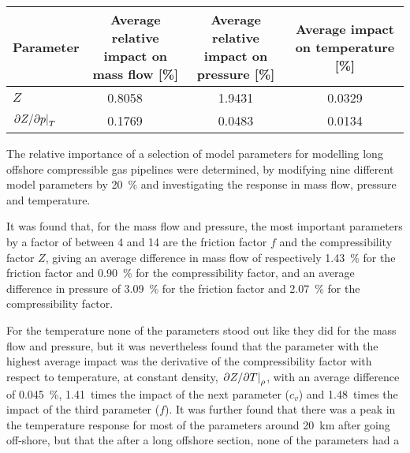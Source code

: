 \begin{table}[!hb]
    \caption{
    }
    \centering
    \begin{tabular}{lclcc}
        \toprule
        Parameter & \multicolumn{2}{c}{\parbox{4cm}{\centering Average relative impact on mass flow [\si{\percent}]}} & \parbox{4cm}{\centering Average relative impact on pressure [\si{\percent}]} & \parbox{4cm}{\centering Average impact on temperature [\si{\percent}]} \\
        \midrule
        $Z$ & 0.8058 & \colorbox{green}{\hspace{0.8058cm}} & 1.9431 & 0.0329 \\
        $\eval{\partial Z/\partial p}_T$ & 0.1769 & \colorbox{green}{\hspace{0.1769cm}} & 0.0483 & 0.0134 \\
        \bottomrule
    \end{tabular}
\end{table}

The relative importance of a selection of model parameters for modelling long offshore compressible gas pipelines were determined, by modifying nine different model parameters by \SI{20}{\percent} and investigating the response in mass flow, pressure and temperature.

It was found that, for the mass flow and pressure, the most important parameters by a factor of between 4 and 14 are the friction factor $f$ and the compressibility factor $Z$, giving an average difference in mass flow of respectively \SI{1.43}{\percent} for the friction factor and \SI{0.90}{\percent} for the compressibility factor, and an average difference in pressure of \SI{3.09}{\percent} for the friction factor and \SI{2.07}{\percent} for the compressibility factor.

For the temperature none of the parameters stood out like they did for the mass flow and pressure, but it was nevertheless found that the parameter with the highest average impact was the derivative of the compressibility factor with respect to temperature, at constant density, $\eval{\partial Z/\partial T}_\rho$, with an average difference of \SI{0.045}{\percent}, 1.41~times the impact of the next parameter ($c_v$) and 1.48~times the impact of the third parameter ($f$). It was further found that there was a peak in the temperature response for most of the parameters around \SI{20}{\kilo\meter} after going off-shore, but that the 
after a long offshore section, none of the parameters had a 

